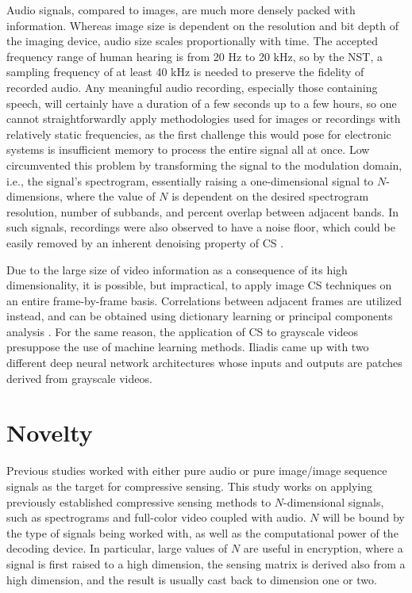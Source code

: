 Audio signals, compared to images, are much more densely packed with information. Whereas image size is dependent on the resolution and bit depth of the imaging device, audio size scales proportionally with time. The accepted frequency range of human hearing is from 20 Hz to 20 kHz, so by the NST, a sampling frequency of at least 40 kHz is needed to preserve the fidelity of recorded audio. Any meaningful audio recording, especially those containing speech, will certainly have a duration of a few seconds up to a few hours, so one cannot straightforwardly apply methodologies used for images or recordings with relatively static frequencies, as the first challenge this would pose for electronic systems is insufficient memory to process the entire signal all at once. Low \cite{Low2013,Low2018} circumvented this problem by transforming the signal to the modulation domain, i.e., the signal's spectrogram, essentially raising a one-dimensional signal to $N$-dimensions, where the value of $N$ is dependent on the desired spectrogram resolution, number of subbands, and percent overlap between adjacent bands. In such signals, recordings were also observed to have a noise floor, which could be easily removed by an inherent denoising property of CS \cite{Dabov2007}.

Due to the large size of video information as a consequence of its high dimensionality, it is possible, but impractical, to apply image CS techniques on an entire frame-by-frame basis. Correlations between adjacent frames are utilized instead, and can be obtained using dictionary learning \cite{Liu2013} or principal components analysis \cite{Liu2014}. For the same reason, the application of CS to grayscale videos presuppose the use of machine learning methods. Iliadis \cite{Iliadis2018,Iliadis2020} came up with two different deep neural network architectures whose inputs and outputs are patches derived from grayscale videos.


\section{Novelty}
\label{sec:novel}
Previous studies worked with either pure audio or pure image/image sequence signals as the target for compressive sensing. This study works on applying previously established compressive sensing methods to $N$-dimensional signals, such as spectrograms and full-color video coupled with audio. $N$ will be bound by the type of signals being worked with, as well as the computational power of the decoding device. In particular, large values of $N$ are useful in encryption, where a signal is first raised to a high dimension, the sensing matrix is derived also from a high dimension, and the result is usually cast back to dimension one or two.
